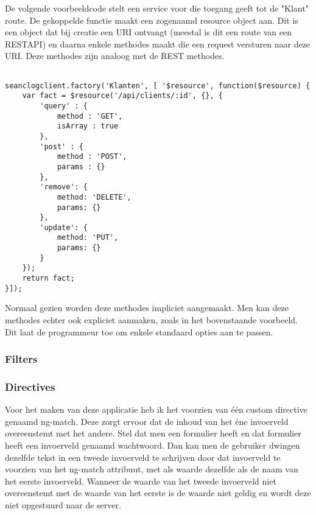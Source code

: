 \documentclass[a4paper,11pt]{article}
\begin{document}
De volgende voorbeeldcode stelt een service voor die toegang geeft tot de "Klant" route. De gekoppelde functie maakt een zogenaamd resource object aan. Dit is een object dat bij creatie een URI ontvangt (meestal is dit een route van een RESTAPI) en daarna enkele methodes maakt die een request versturen naar deze URI. Deze methodes zijn analoog met de REST methodes.
\begin{lstlisting}

seanclogclient.factory('Klanten', [ '$resource', function($resource) {
	var fact = $resource('/api/clients/:id', {}, {
		'query' : {
			method : 'GET',
			isArray : true
		},
		'post' : {
			method : 'POST',
			params : {}
		},
		'remove': {
			method: 'DELETE',
			params: {}
		},
		'update': {
			method: 'PUT',
			params: {}
		}
	});
	return fact;
}]);

\end{lstlisting}

Normaal gezien worden deze methodes impliciet aangemaakt. Men kan deze methodes echter ook expliciet aanmaken, zoals in het bovenstaande voorbeeld. Dit laat de programmeur toe om enkele standaard opties aan te passen.

\subsubsection{Filters}

\subsubsection{Directives}
Voor het maken van deze applicatie heb ik het voorzien van één custom directive genaamd ng-match. Deze zorgt ervoor dat de inhoud van het éne invoerveld overeenstemt met het andere. Stel dat men een formulier heeft en dat formulier heeft een invoerveld genaamd wachtwoord. Dan kan men de gebruiker dwingen dezelfde tekst in een tweede invoerveld te schrijven door dat invoerveld te voorzien van het ng-match attribuut, met als waarde dezelfde als de naam van het eerste invoerveld. Wanneer de waarde van het tweede invoerveld niet overeenstemt met de waarde van het eerste is de waarde niet geldig en wordt deze niet opgestuurd naar de server. \cite{angular:directives}
\end{document}

